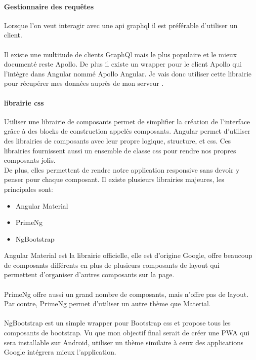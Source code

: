 \paragraph{Gestionnaire des requêtes}
Lorsque l'on veut interagir avec une \Gls{api} \Gls{graphql} il est préférable d'utiliser un client.\\\\

Il existe une multitude de clients GraphQl mais le plus populaire et le mieux documenté reste Apollo.
De plus il existe un wrapper pour le client Apollo qui l'intègre dans Angular nommé Apollo Angular.
Je vais donc utiliser cette librairie pour récupérer mes données auprès de mon serveur .

\paragraph{librairie \Gls{css}}
Utiliser une librairie de composants permet de simplifier la création de l'interface grâce à des blocks de construction appelés composants\@.
Angular permet d'utiliser des librairies de composants avec leur propre logique, structure, et \Gls{css}\@.
Ces librairies fournissent aussi un ensemble de classe \Gls{css} pour rendre nos propres composants jolis.\\
De plus, elles permettent de rendre notre application responsive sans devoir y penser pour chaque composant.
Il existe plusieurs librairies majeures, les principales sont:
\begin{itemize}
    \item Angular Material
    \item PrimeNg
    \item NgBootstrap
\end{itemize}
Angular Material est la librairie officielle, elle est d'origine Google,
offre beaucoup de composants différents en plus de plusieurs composants de layout qui permettent d'organiser d'autres composants sur la page.\\\\

PrimeNg offre aussi un grand nombre de composants, mais n'offre pas de layout.
Par contre, PrimeNg permet d'utiliser un autre thème que Material.\\\\
NgBootstrap est un simple wrapper pour Bootstrap \Gls{css} et propose tous les composants de bootstrap.
Vu que mon objectif final serait de créer une PWA qui sera installable sur Android,
utiliser un thème similaire à ceux des applications Google intégrera mieux l'application.

